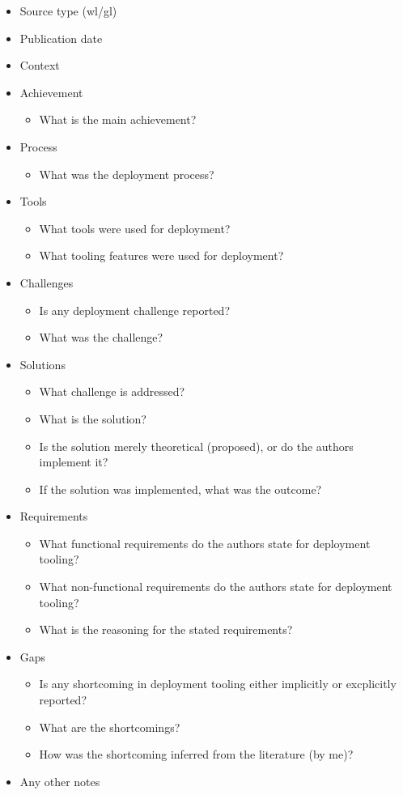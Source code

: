 \begin{itemize}
    \item Source type (\acrshort{wl}/\acrshort{gl})
    \item Publication date
    \item Context
    \item Achievement
    \begin{itemize}
        \item What is the main achievement?
    \end{itemize}
    \item Process
    \begin{itemize}
        \item What was the deployment process?
    \end{itemize}
    \item Tools
    \begin{itemize}
        \item What tools were used for deployment?
        \item What tooling features were used for deployment?
    \end{itemize}
    \item Challenges
    \begin{itemize}
        \item Is any deployment challenge reported?
        \item What was the challenge?
    \end{itemize}
    \item Solutions
    \begin{itemize}
        \item What challenge is addressed?
        \item What is the solution?
        \item Is the solution merely theoretical (proposed), or do the authors implement it?
        \item If the solution was implemented, what was the outcome?
    \end{itemize}
    \item Requirements
    \begin{itemize}
        \item What functional requirements do the authors state for deployment tooling?
        \item What non-functional requirements do the authors state for deployment tooling?
        \item What is the reasoning for the stated requirements?
    \end{itemize}
    \item Gaps
    \begin{itemize}
        \item Is any shortcoming in deployment tooling either implicitly or excplicitly reported?
        \item What are the shortcomings?
        \item How was the shortcoming inferred from the literature (by me)?
    \end{itemize}
    \item Any other notes
\end{itemize}

